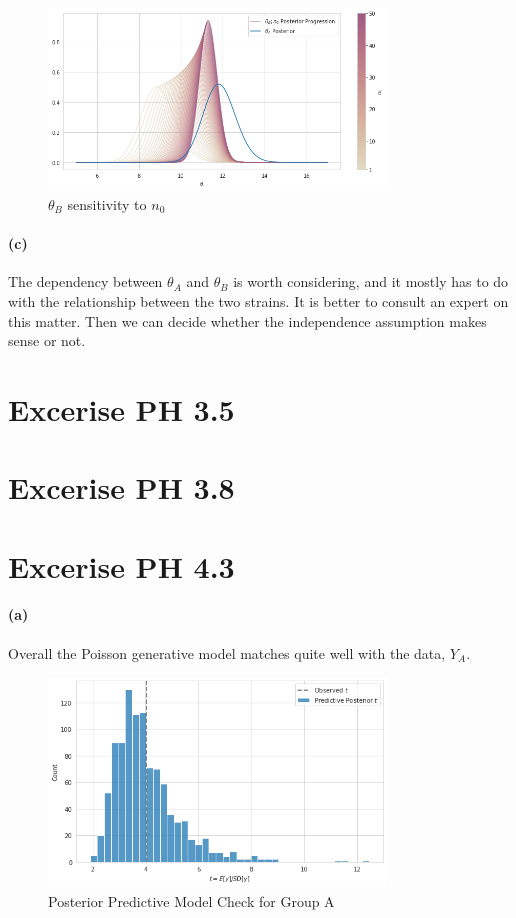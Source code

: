 \documentclass[11pt, letterpaper]{article}
\begin{document}
\begin{figure}[!h]
  \centering
  \includegraphics[width=0.8\textwidth]{3.3.b.png}
  \captionsetup{justification=centering}
  \caption{$\theta_B$ sensitivity to $n_0$}
\end{figure}

\paragraph{(c)}
The dependency between $\theta_A$ and $\theta_B$ is worth considering, and it mostly has to do with the
relationship between the two strains. It is better to consult an expert on this matter. Then we can decide
whether the independence assumption makes sense or not. 


\section{Excerise PH 3.5}


\section{Excerise PH 3.8}
\newpage


\section{Excerise PH 4.3}
\paragraph{(a)}
Overall the Poisson generative model matches quite well with the data, $Y_A$. 

\begin{figure}[!h]
  \centering
  \includegraphics[width=0.8\textwidth]{4.3.a.png}
  \captionsetup{justification=centering}
  \caption{Posterior Predictive Model Check for Group A}
\end{figure}
\end{document}
